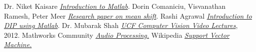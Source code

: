 \documentclass[a4paper,12pt,oneside]{book}
\begin{document}
\begin{thebibliography}{li}
Dr. Niket Kaisare
{\em \href{https://www.youtube.com/watch?v=pj4KKLUMIAg&list=PLa8a_8vztYc7aK6H4bpQTbOqelVIND9Aw}{Introduction to Matlab}}.
Dorin Comaniciu, Visvanathan Ramesh, Peter Meer
{\em \href{http://comaniciu.net/Papers/MsTracking.pdf}{Research paper on mean shift}}.
 Rashi Agrawal
{\em \href{https://www.youtube.com/watch?v=-cSVGwAwZZ4&list=PLEo-jHOqGNyUWoCSD3l3V-FjX9PnHvx5n}{Introduction to DIP using Matlab}}.
 Dr. Mubarak Shah
{\em \href{https://www.youtube.com/watch?v=M8B3RZVqgOo}{UCF Computer Vision Video Lectures}},
2012.
Mathworks Community
{\em \href{http://in.mathworks.com/help/signal/examples/practical-introduction-to-frequency-domain-analysis.html}{Audio Processing.}}
Wikipedia
{\em \href{https://en.wikipedia.org/wiki/Support_vector_machine}{Support Vector Machine.}}

\end{thebibliography}
\end{document}
